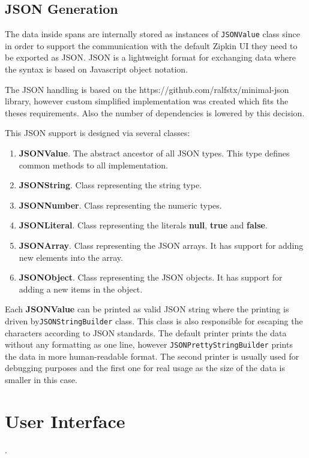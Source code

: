 \subsection{JSON Generation}
The data inside spans are internally stored as instances of \texttt{JSONValue} class since in order to support the communication with the default Zipkin UI they need to be exported as JSON. JSON is a lightweight format for exchanging data where the syntax is based on Javascript object notation.

The JSON handling is based on the https://github.com/ralfstx/minimal-json library, however custom simplified implementation was created which fits the theses requirements. Also the number of dependencies is lowered by this decision. 

This JSON support is designed via several classes:
\begin{enumerate}
	\item \textbf{JSONValue}. The abstract ancestor of all JSON types. This type defines common methods to all implementation.
	\item \textbf{JSONString}. Class representing the string type.
	\item \textbf{JSONNumber}. Class representing the numeric types.
	\item \textbf{JSONLiteral}. Class representing the literals \textbf{null}, \textbf{true} and \textbf{false}.
	\item \textbf{JSONArray}. Class representing the JSON arrays. It has support for adding new elements into the array.
	\item \textbf{JSONObject}. Class representing the JSON objects. It has support for adding a new items in the object.
\end{enumerate}

Each \textbf{JSONValue} can be printed as valid JSON string where the printing is driven by\texttt{JSONStringBuilder} class. This class is also responsible for escaping the characters according to JSON standards. The default printer prints the data without any formatting as one line, however \texttt{JSONPrettyStringBuilder} prints the data in more human-readable format. The second printer is usually used for debugging purposes and the first one for real usage as the size of the data is smaller in this case.

\section{User Interface}
\label{sec:zipkin_ui}.

